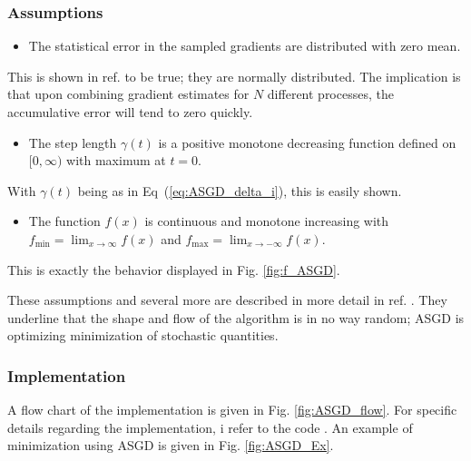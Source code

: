 \subsubsection{Assumptions}
\begin{itemize}
 \item The statistical error in the sampled gradients are distributed with zero mean.
\end{itemize}

This is shown in ref. \cite{ASGD} to be true; they are normally distributed. The implication is that upon combining gradient estimates for $N$ different processes, the accumulative error will tend to zero quickly.

\begin{itemize}
 \item The step length $\gamma(t)$ is a positive monotone decreasing function defined on $[0,\infty)$ with maximum at $t=0$.
\end{itemize}

With $\gamma(t)$ being as in Eq~(\ref{eq:ASGD_delta_i}), this is easily shown.

\begin{itemize}
 \item The function $f(x)$ is continuous and monotone increasing with $f_\mathrm{min} = \displaystyle\lim_{x\to\infty} f(x)$ and $f_\mathrm{max} =  \displaystyle\lim_{x\to-\infty} f(x)$.
\end{itemize}

This is exactly the behavior displayed in Fig. \ref{fig:f_ASGD}.


These assumptions and several more are described in more detail in ref. \cite{ASGD}. They underline that the shape and flow of the algorithm is in no way random; ASGD is optimizing minimization of stochastic quantities. 

\subsubsection{Implementation}

A flow chart of the implementation is given in Fig. \ref{fig:ASGD_flow}. For specific details regarding the implementation, i refer to the code \cite{libBorealisCode}. An example of minimization using ASGD is given in Fig. \ref{fig:ASGD_Ex}. 

